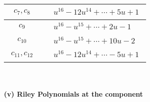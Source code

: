 \documentclass[1p]{elsarticle_modified}
\theoremstyle{definition}
\begin{document}
\begin{tabular}{m{50pt}|m{274pt}}
\hline $$\begin{aligned}c_{7},c_{8}\end{aligned}$$&$\begin{aligned}
&u^{16}-12 u^{14}+\cdots+5 u+1
\end{aligned}$\\
\hline $$\begin{aligned}c_{9}\end{aligned}$$&$\begin{aligned}
&u^{16}- u^{15}+\cdots+2 u-1
\end{aligned}$\\
\hline $$\begin{aligned}c_{10}\end{aligned}$$&$\begin{aligned}
&u^{16}- u^{15}+\cdots+10 u-2
\end{aligned}$\\
\hline $$\begin{aligned}c_{11},c_{12}\end{aligned}$$&$\begin{aligned}
&u^{16}-12 u^{14}+\cdots-5 u+1
\end{aligned}$\\
\hline
\end{tabular}\\~\\
\newpage\renewcommand{\arraystretch}{1}
\flushleft \textbf{(v) Riley Polynomials at the component}\newline \\
\end{document}
